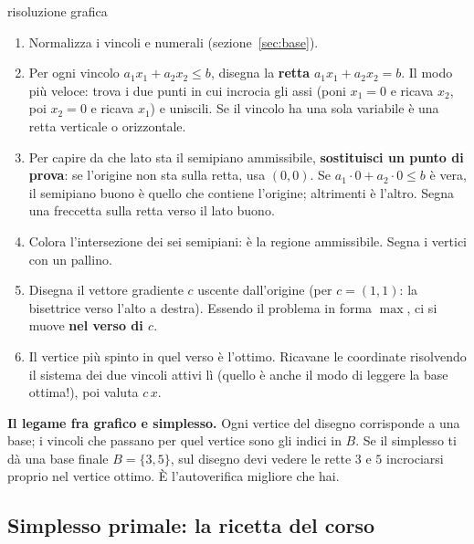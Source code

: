 \documentclass[11pt,a4paper]{article}
\begin{document}
\begin{ric}{risoluzione grafica}
\begin{enumerate}
\item Normalizza i vincoli e numerali (sezione~\ref{sec:base}).
\item Per ogni vincolo $a_1 x_1 + a_2 x_2 \le b$, disegna la \textbf{retta} $a_1x_1+a_2x_2 = b$.
      Il modo più veloce: trova i due punti in cui incrocia gli assi
      (poni $x_1=0$ e ricava $x_2$, poi $x_2=0$ e ricava $x_1$) e uniscili.
      Se il vincolo ha una sola variabile è una retta verticale o orizzontale.
\item Per capire da che lato sta il semipiano ammissibile, \textbf{sostituisci un punto di prova}:
      se l'origine non sta sulla retta, usa $(0,0)$. Se $a_1\cdot 0 + a_2\cdot 0 \le b$ è vera,
      il semipiano buono è quello che contiene l'origine; altrimenti è l'altro.
      Segna una freccetta sulla retta verso il lato buono.
\item Colora l'intersezione dei sei semipiani: è la regione ammissibile. Segna i vertici con un pallino.
\item Disegna il vettore gradiente $c$ uscente dall'origine (per $c=(1,1)$: la bisettrice
      verso l'alto a destra). Essendo il problema in forma $\max$, ci si muove \textbf{nel verso di $c$}.
\item Il vertice più spinto in quel verso è l'ottimo. Ricavane le coordinate risolvendo il sistema
      dei due vincoli attivi lì (quello è anche il modo di leggere la base ottima!), poi valuta $c\,x$.
\end{enumerate}
\end{ric}

\begin{idea}
\textbf{Il legame fra grafico e simplesso.} Ogni vertice del disegno corrisponde a una base;
i vincoli che passano per quel vertice sono gli indici in $B$. Se il simplesso ti dà una base
finale $B=\{3,5\}$, sul disegno devi vedere le rette $3$ e $5$ incrociarsi proprio nel vertice
ottimo. È l'autoverifica migliore che hai.
\end{idea}

\newpage
\subsection{Simplesso primale: la ricetta del corso}
\end{document}
